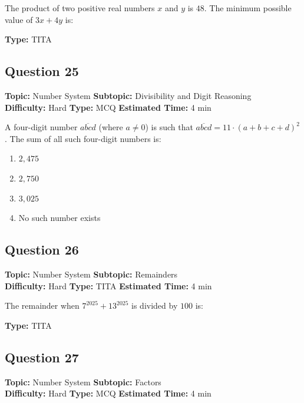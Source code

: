 \documentclass[11pt]{article}
\begin{document}
\begin{tcolorbox}
The product of two positive real numbers \(x\) and \(y\) is \(48\). The minimum possible value of \(3x + 4y\) is:
\end{tcolorbox}

\textbf{Type:} TITA

\subsection*{Question 25}
\textbf{Topic:} Number System \quad \textbf{Subtopic:} Divisibility and Digit Reasoning \\
\textbf{Difficulty:} Hard \quad \textbf{Type:} MCQ \quad \textbf{Estimated Time:} 4 min

\begin{tcolorbox}
A four-digit number \(\overline{abcd}\) (where \(a \ne 0\)) is such that \(\overline{abcd} = 11 \cdot (a + b + c + d)^2\). The sum of all such four-digit numbers is:
\end{tcolorbox}

\begin{enumerate}[label=(\Alph*)]
    \item \(2{,}475\)
    \item \(2{,}750\)
    \item \(3{,}025\)
    \item No such number exists
\end{enumerate}

\subsection*{Question 26}
\textbf{Topic:} Number System \quad \textbf{Subtopic:} Remainders \\
\textbf{Difficulty:} Hard \quad \textbf{Type:} TITA \quad \textbf{Estimated Time:} 4 min

\begin{tcolorbox}
The remainder when \(7^{2025} + 13^{2025}\) is divided by \(100\) is:
\end{tcolorbox}

\textbf{Type:} TITA

\subsection*{Question 27}
\textbf{Topic:} Number System \quad \textbf{Subtopic:} Factors \\
\textbf{Difficulty:} Hard \quad \textbf{Type:} MCQ \quad \textbf{Estimated Time:} 4 min
\end{document}
